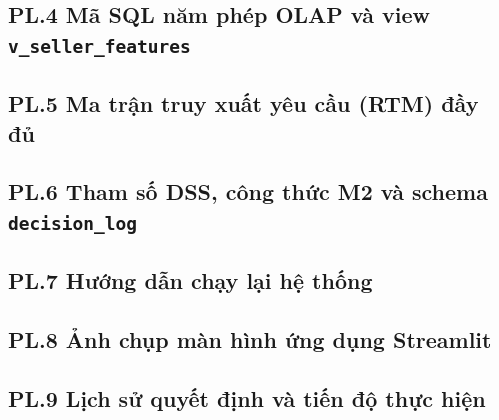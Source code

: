\documentclass[a4paper]{article}
\begin{document}
\label{pl:4}
\subsection*{PL.4 Mã SQL năm phép OLAP và view \texttt{v\_seller\_features}}

\label{pl:5}
\subsection*{PL.5 Ma trận truy xuất yêu cầu (RTM) đầy đủ}

\label{pl:6}
\subsection*{PL.6 Tham số DSS, công thức M2 và schema \texttt{decision\_log}}

\label{pl:7}
\subsection*{PL.7 Hướng dẫn chạy lại hệ thống}

\label{pl:8}
\subsection*{PL.8 Ảnh chụp màn hình ứng dụng Streamlit}

\label{pl:9}
\subsection*{PL.9 Lịch sử quyết định và tiến độ thực hiện}
\end{document}

